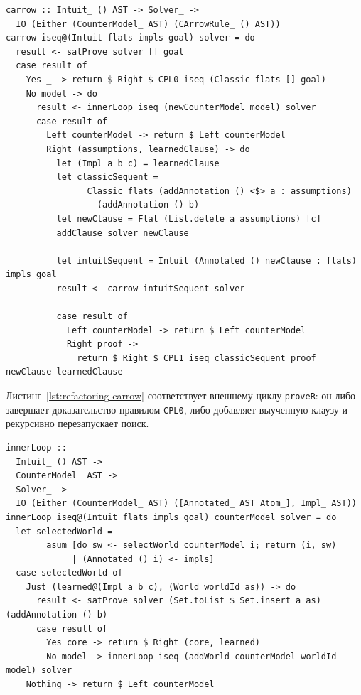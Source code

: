 \documentclass[14pt, russian]{scrartcl}
\begin{document}
\begin{listing}[!htb]
\caption{Основной цикл поиска вывода в $C^{\rightarrow}$}
\label{lst:refactoring-carrow}
\begin{verbatim}
carrow :: Intuit_ () AST -> Solver_ ->
  IO (Either (CounterModel_ AST) (CArrowRule_ () AST))
carrow iseq@(Intuit flats impls goal) solver = do
  result <- satProve solver [] goal
  case result of
    Yes _ -> return $ Right $ CPL0 iseq (Classic flats [] goal)
    No model -> do
      result <- innerLoop iseq (newCounterModel model) solver
      case result of
        Left counterModel -> return $ Left counterModel
        Right (assumptions, learnedClause) -> do
          let (Impl a b c) = learnedClause
          let classicSequent =
                Classic flats (addAnnotation () <$> a : assumptions)
                  (addAnnotation () b)
          let newClause = Flat (List.delete a assumptions) [c]
          addClause solver newClause

          let intuitSequent = Intuit (Annotated () newClause : flats) impls goal
          result <- carrow intuitSequent solver

          case result of
            Left counterModel -> return $ Left counterModel
            Right proof ->
              return $ Right $ CPL1 iseq classicSequent proof newClause learnedClause
\end{verbatim}
\end{listing}

Листинг~\ref{lst:refactoring-carrow} соответствует внешнему циклу
\texttt{proveR}: он либо завершает доказательство правилом \texttt{CPL0}, либо
добавляет выученную клаузу и рекурсивно перезапускает поиск.

\begin{listing}[!htb]
\caption{Внутренний цикл построения контрмодели}
\label{lst:refactoring-inner-loop}
\begin{verbatim}
innerLoop ::
  Intuit_ () AST ->
  CounterModel_ AST ->
  Solver_ ->
  IO (Either (CounterModel_ AST) ([Annotated_ AST Atom_], Impl_ AST))
innerLoop iseq@(Intuit flats impls goal) counterModel solver = do
  let selectedWorld =
        asum [do sw <- selectWorld counterModel i; return (i, sw)
             | (Annotated () i) <- impls]
  case selectedWorld of
    Just (learned@(Impl a b c), (World worldId as)) -> do
      result <- satProve solver (Set.toList $ Set.insert a as) (addAnnotation () b)
      case result of
        Yes core -> return $ Right (core, learned)
        No model -> innerLoop iseq (addWorld counterModel worldId model) solver
    Nothing -> return $ Left counterModel
\end{verbatim}
\end{listing}
\end{document}
